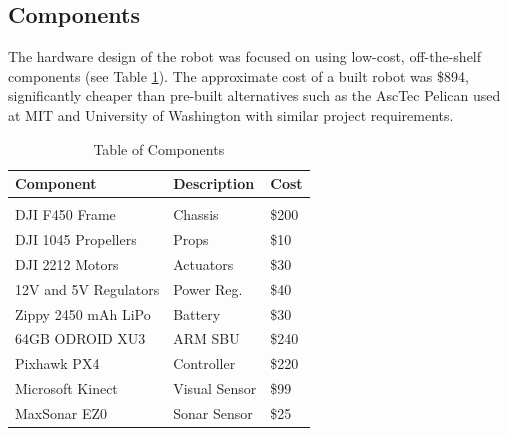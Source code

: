 \documentclass[letterpaper, oneside, 10pt]{report}
\begin{document}
\subsection{Components}
The hardware design of the robot was focused on using low-cost, off-the-shelf components (see Table \ref{tbl: components.}). The approximate cost of a built robot was \$894, significantly cheaper than pre-built alternatives such as the AscTec Pelican used at MIT \cite{bachrach2011range} and University of Washington \cite{bachrach2012estimation} with similar project requirements.

\begin{table}[h!]
  \centering
  \caption{Table of Components}
  \vspace{2mm}
  \begin{tabular}{l l l}
    \hline \hline
    \vspace{-2mm}
    Component & \multicolumn{1}{l}{Description} & \multicolumn{1}{l}{Cost} \\ [1ex]
    \hline
    & \\
    DJI F450 Frame & Chassis & \$200 \\
    DJI 1045 Propellers & Props & \$10 \\
    DJI 2212 Motors & Actuators & \$30 \\
    12V and 5V Regulators & Power Reg. & \$40 \\
    Zippy 2450 mAh LiPo & Battery & \$30 \\
    64GB ODROID XU3 & ARM SBU & \$240 \\
    Pixhawk PX4 & Controller & \$220 \\
    Microsoft Kinect & Visual Sensor & \$99 \\
    MaxSonar EZ0	& Sonar Sensor & \$25 \\
  \end{tabular}
  \label{tbl: components.}
\end{table}
\end{document}
